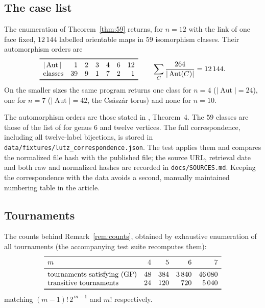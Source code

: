 \documentclass[11pt,reqno]{amsart}
\theoremstyle{plain}
\theoremstyle{definition}
\newcommand{\Aut}{\operatorname{Aut}}
\begin{document}
\subsection{The case list}
The enumeration of Theorem~\ref{thm:59} returns, for $n=12$ with the link of one face fixed,
$12\,144$ labelled orientable maps in $59$ isomorphism classes. Their automorphism orders are
\[
\begin{array}{lrrrrrr}
\toprule
|\Aut| & 1 & 2 & 3 & 4 & 6 & 12\\
\text{classes} & 39 & 9 & 1 & 7 & 2 & 1\\
\bottomrule
\end{array}
\qquad
\sum_{C}\frac{264}{|\Aut(C)|}=12\,144 .
\]
On the smaller sizes the same program returns one class for $n=4$ ($|\Aut|=24$), one for
$n=7$ ($|\Aut|=42$, the Császár torus) and none for $n=10$.

The automorphism orders are those stated in \cite{EllinghamStephens2005}, Theorem~4. The $59$
classes are those of the list of \cite{LutzManifoldPage} for genus $6$ and twelve vertices. The full correspondence, including all twelve-label bijections, is stored in
\texttt{data/fixtures/lutz\_correspondence.json}. The test applies them and compares
the normalized file hash with the published file; the source URL, retrieval date
and both raw and normalized hashes are recorded in \texttt{docs/SOURCES.md}.
Keeping the correspondence with the data avoids a second, manually maintained
numbering table in the article.

\subsection{Tournaments}
The counts behind Remark~\ref{rem:counts}, obtained by exhaustive enumeration of all tournaments
(the accompanying test suite recomputes them):
\[
\begin{array}{lrrrr}
\toprule
m & 4 & 5 & 6 & 7\\
\midrule
\text{tournaments satisfying (GP)} & 48 & 384 & 3\,840 & 46\,080\\
\text{transitive tournaments} & 24 & 120 & 720 & 5\,040\\
\bottomrule
\end{array}
\]
matching $(m-1)!\,2^{\,m-1}$ and $m!$ respectively.
\end{document}

